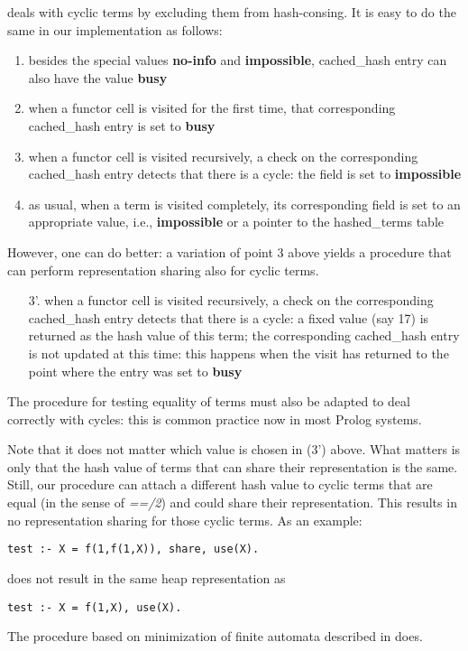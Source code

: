 \documentclass{tlp}
\begin{document}
\cite{appelhashconsinggc} deals with cyclic terms by excluding them
from hash-consing. It is easy to do the same in our implementation as
follows:
\begin{enumerate}
\item 
besides the special values {\bf no-info} and {\bf impossible}, 
cached\_hash entry can also have the value {\bf busy}
\item 
when a functor cell is visited for the first time, that corresponding
cached\_hash entry is set to {\bf busy}
\item 
when a functor cell is visited recursively, a check on the
corresponding cached\_hash entry detects that there is a cycle: the
field is set to {\bf impossible}
\item
as usual, when a term is visited completely, its corresponding field
is set to an appropriate value, i.e., {\bf impossible} or a pointer to
the hashed\_terms table
\end{enumerate}

However, one can do better: a variation of point 3 above yields a
procedure that can perform representation sharing also for cyclic
terms.
\begin{enumerate}
\item[3'.]
when a functor cell is visited recursively, a check on the
corresponding cached\_hash entry detects that there is a cycle: a
fixed value (say 17) is returned as the hash value of this term; the
corresponding cached\_hash entry is not updated at this time: this
happens when the visit has returned to the point where the entry was
set to {\bf busy}
\end{enumerate}

The procedure for testing equality of terms must also be adapted to
deal correctly with cycles: this is common practice now in most Prolog
systems.


Note that it does not matter which value is chosen in (3') above.
What matters is only that the hash value of terms that can share their
representation is the same. Still, our procedure can attach a
different hash value to cyclic terms that are equal (in the sense of
{\em ==/2}) and could share their representation. This results in no
representation sharing for those cyclic terms. As an example:
\begin{Verbatim}[fontsize=\small, frame=single,samepage=true]
        test :- X = f(1,f(1,X)), share, use(X).
\end{Verbatim}
does not result in the same heap representation as
\begin{Verbatim}[fontsize=\small, frame=single,samepage=true]
        test :- X = f(1,X), use(X).
\end{Verbatim}
The procedure based on minimization of finite automata described in
\cite{neumerkeldiplomarbeit} does.
\end{document}
